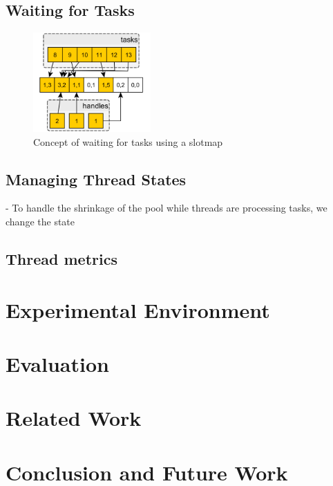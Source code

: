 \documentclass[conference]{IEEEtran}
\begin{document}
\subsection{Waiting for Tasks}

\begin{figure}
	\includegraphics[width=0.4\textwidth]{img/waitingconcept.png}
	\caption{Concept of waiting for tasks using a slotmap}
	\label{fig2}
\end{figure}


\subsection{Managing Thread States}
- To handle the shrinkage of the pool while threads are processing tasks, we change the state

\subsection{Thread metrics}

\section{Experimental Environment}

\section{Evaluation}

\section{Related Work}

\section{Conclusion and Future Work}
\cite{pyarali2001evaluating}

 
\end{document}
